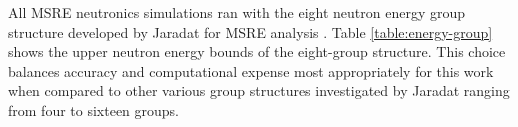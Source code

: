 

All \gls{MSRE} neutronics simulations ran with the eight neutron energy group structure developed
by Jaradat for \gls{MSRE} analysis \cite{jaradat_development_2021-1}.
Table \ref{table:energy-group} shows the upper neutron energy bounds of the eight-group structure.
This choice balances accuracy and computational expense most appropriately for this work when
compared to other various group structures investigated by Jaradat ranging from four to sixteen
groups.

